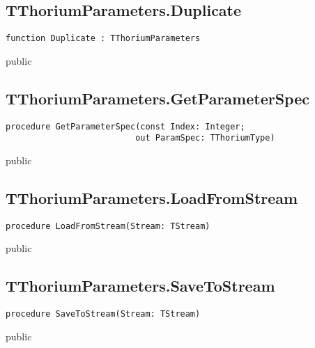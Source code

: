 \subsection{TThoriumParameters.Duplicate}
\label{thoriumcorepkg:thorium:tthoriumparameters:duplicate}
\begin{FPCList}
\Declaration 

\begin{verbatim}
function Duplicate : TThoriumParameters
\end{verbatim}
\Visibility
public
\end{FPCList}
\subsection{TThoriumParameters.GetParameterSpec}
\label{thoriumcorepkg:thorium:tthoriumparameters:getparameterspec}
\begin{FPCList}
\Declaration 

\begin{verbatim}
procedure GetParameterSpec(const Index: Integer;
                          out ParamSpec: TThoriumType)
\end{verbatim}
\Visibility
public
\end{FPCList}
\subsection{TThoriumParameters.LoadFromStream}
\label{thoriumcorepkg:thorium:tthoriumparameters:loadfromstream}
\begin{FPCList}
\Declaration 

\begin{verbatim}
procedure LoadFromStream(Stream: TStream)
\end{verbatim}
\Visibility
public
\end{FPCList}
\subsection{TThoriumParameters.SaveToStream}
\label{thoriumcorepkg:thorium:tthoriumparameters:savetostream}
\begin{FPCList}
\Declaration 

\begin{verbatim}
procedure SaveToStream(Stream: TStream)
\end{verbatim}
\Visibility
public
\end{FPCList}
